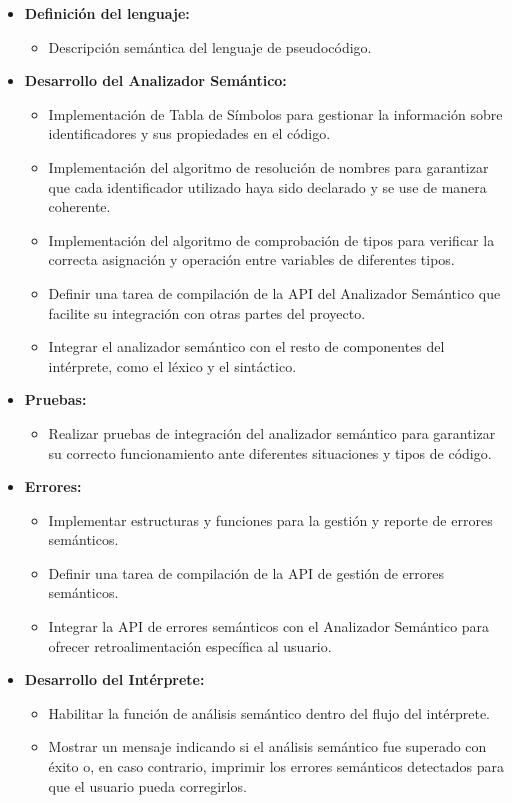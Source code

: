 \begin{itemize}
    \item \textbf{Definición del lenguaje:}
    \begin{itemize}
        \item Descripción semántica del lenguaje de pseudocódigo.
    \end{itemize}
    
    \item \textbf{Desarrollo del Analizador Semántico:}
    \begin{itemize}
        \item Implementación de Tabla de Símbolos para gestionar la información sobre identificadores y sus propiedades en el código.
        \item Implementación del algoritmo de resolución de nombres para garantizar que cada identificador utilizado haya sido declarado y se use de manera coherente.
        \item Implementación del algoritmo de comprobación de tipos para verificar la correcta asignación y operación entre variables de diferentes tipos.
        \item Definir una tarea de compilación de la API del Analizador Semántico que facilite su integración con otras partes del proyecto.
        \item Integrar el analizador semántico con el resto de componentes del intérprete, como el léxico y el sintáctico.
    \end{itemize}

    \item \textbf{Pruebas:}
    \begin{itemize}
        \item Realizar pruebas de integración del analizador semántico para garantizar su correcto funcionamiento ante diferentes situaciones y tipos de código.
    \end{itemize}

    \item \textbf{Errores:}
    \begin{itemize}
        \item Implementar estructuras y funciones para la gestión y reporte de errores semánticos.
        \item Definir una tarea de compilación de la API de gestión de errores semánticos.
        \item Integrar la API de errores semánticos con el Analizador Semántico para ofrecer retroalimentación específica al usuario.
    \end{itemize}

    \item \textbf{Desarrollo del Intérprete:}
    \begin{itemize}
        \item Habilitar la función de análisis semántico dentro del flujo del intérprete.
        \item Mostrar un mensaje indicando si el análisis semántico fue superado con éxito o, en caso contrario, imprimir los errores semánticos detectados para que el usuario pueda corregirlos.
    \end{itemize}
\end{itemize}

